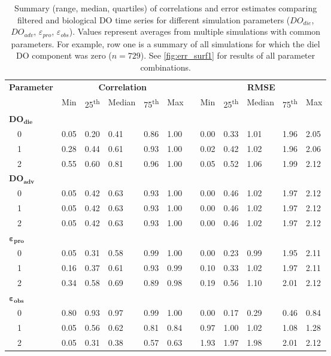 \documentclass[letterpaper,12pt,oneside]{article}\usepackage[]{graphicx}\usepackage[]{color}
\begin{document}
\begin{table}[h]
\caption{Summary (range, median, quartiles) of correlations and error estimates comparing filtered and biological \ac{DO} time series for different simulation parameters ($DO_{die}$, $DO_{adv}$, $\varepsilon_{pro}$, $\varepsilon_{obs}$).  Values represent averages from multiple simulations with common parameters.  For example, row one is a summary of all simulations for which the diel \ac{DO} component was zero ($n=729$).  See \cref{fig:err_surf1} for results of all parameter combinations.\label{tab:dtd_perf1}} 
\begin{center}
\begin{tabular}{llllllclllll}
\hline\hline
\multicolumn{1}{l}{\bfseries Parameter}&\multicolumn{5}{c}{\bfseries Correlation}&\multicolumn{1}{c}{\bfseries }&\multicolumn{5}{c}{\bfseries RMSE}\tabularnewline
\cline{2-6} \cline{8-12}
\multicolumn{1}{l}{}&\multicolumn{1}{c}{Min}&\multicolumn{1}{c}{25\textsuperscript{th}}&\multicolumn{1}{c}{Median}&\multicolumn{1}{c}{75\textsuperscript{th}}&\multicolumn{1}{c}{Max}&\multicolumn{1}{c}{}&\multicolumn{1}{c}{Min}&\multicolumn{1}{c}{25\textsuperscript{th}}&\multicolumn{1}{c}{Median}&\multicolumn{1}{c}{75\textsuperscript{th}}&\multicolumn{1}{c}{Max}\tabularnewline
\hline
{\bfseries $\boldsymbol{DO_{die}}$}&&&&&&&&&&&\tabularnewline
~~0&0.05&0.20&0.41&0.86&1.00&&0.00&0.33&1.01&1.96&2.05\tabularnewline
~~1&0.28&0.44&0.61&0.93&1.00&&0.02&0.42&1.02&1.96&2.06\tabularnewline
~~2&0.55&0.60&0.81&0.96&1.00&&0.05&0.52&1.06&1.99&2.12\tabularnewline
\hline
{\bfseries $\boldsymbol{DO_{adv}}$}&&&&&&&&&&&\tabularnewline
~~0&0.05&0.42&0.63&0.93&1.00&&0.00&0.46&1.02&1.97&2.12\tabularnewline
~~1&0.05&0.42&0.63&0.93&1.00&&0.00&0.46&1.02&1.97&2.12\tabularnewline
~~2&0.05&0.42&0.63&0.93&1.00&&0.00&0.46&1.02&1.97&2.12\tabularnewline
\hline
{\bfseries $\boldsymbol{\varepsilon_{pro}}$}&&&&&&&&&&&\tabularnewline
~~0&0.05&0.31&0.58&0.99&1.00&&0.00&0.23&0.99&1.95&2.11\tabularnewline
~~1&0.16&0.37&0.61&0.93&0.99&&0.10&0.33&1.02&1.97&2.11\tabularnewline
~~2&0.34&0.58&0.69&0.89&0.98&&0.19&0.56&1.10&2.01&2.12\tabularnewline
\hline
{\bfseries $\boldsymbol{\varepsilon_{obs}}$}&&&&&&&&&&&\tabularnewline
~~0&0.80&0.93&0.97&0.99&1.00&&0.00&0.17&0.29&0.46&0.84\tabularnewline
~~1&0.05&0.56&0.62&0.81&0.84&&0.97&1.00&1.02&1.08&1.28\tabularnewline
~~2&0.05&0.31&0.38&0.57&0.63&&1.93&1.97&1.98&2.01&2.12\tabularnewline
\hline
\end{tabular}\end{center}

\end{table}
\end{document}
